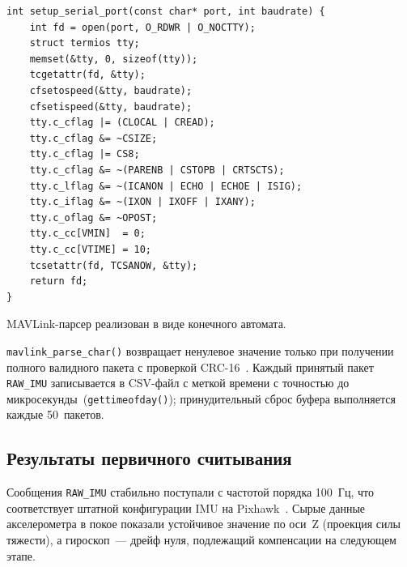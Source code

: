 \documentclass[../main.tex]{subfiles}
\begin{document}
\begin{lstlisting}[caption={Настройка последовательного порта через termios}]
int setup_serial_port(const char* port, int baudrate) {
    int fd = open(port, O_RDWR | O_NOCTTY);
    struct termios tty;
    memset(&tty, 0, sizeof(tty));
    tcgetattr(fd, &tty);
    cfsetospeed(&tty, baudrate);
    cfsetispeed(&tty, baudrate);
    tty.c_cflag |= (CLOCAL | CREAD);
    tty.c_cflag &= ~CSIZE;
    tty.c_cflag |= CS8;
    tty.c_cflag &= ~(PARENB | CSTOPB | CRTSCTS);
    tty.c_lflag &= ~(ICANON | ECHO | ECHOE | ISIG);
    tty.c_iflag &= ~(IXON | IXOFF | IXANY);
    tty.c_oflag &= ~OPOST;
    tty.c_cc[VMIN]  = 0;
    tty.c_cc[VTIME] = 10;
    tcsetattr(fd, TCSANOW, &tty);
    return fd;
}
\end{lstlisting}
 
MAVLink-парсер реализован в виде конечного автомата.

\texttt{mavlink\_parse\_char()} возвращает ненулевое значение только
при получении полного валидного пакета с проверкой CRC-16~\cite{mavlink_proto}.
Каждый принятый пакет \texttt{RAW\_IMU} записывается в CSV-файл с меткой
времени с точностью до микросекунды~(\texttt{gettimeofday()}); принудительный
сброс буфера выполняется каждые 50~пакетов.


\subsection{Результаты первичного считывания}
 
Сообщения \texttt{RAW\_IMU} стабильно поступали с частотой порядка
100~Гц, что соответствует штатной конфигурации IMU на
Pixhawk~\cite{px4_docs}. Сырые данные акселерометра в покое показали
устойчивое значение по оси~Z (проекция силы тяжести), а гироскоп~---
дрейф нуля, подлежащий компенсации на следующем этапе.
\end{document}
